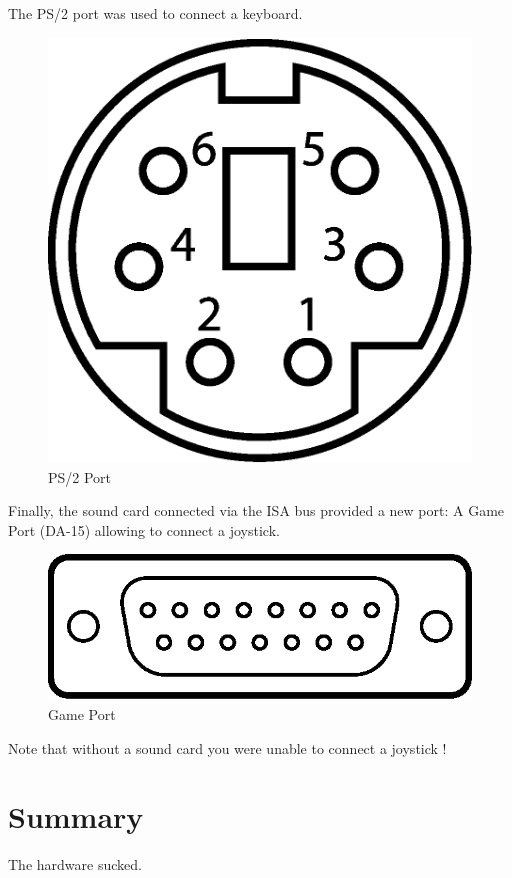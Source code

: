 \documentclass[book.tex]{subfiles}
\begin{document}
The PS/2 port was used to connect a keyboard.
 \begin{figure}[H]
\centering
\includegraphics[scale=0.2]{imgs/ports/MiniDIN-6_PS2.eps}
%
\caption{PS/2 Port}
\label{fig:ps2Port}
\end{figure}


Finally, the sound card connected via the ISA bus provided a new port: A Game Port (DA-15) allowing to connect a joystick.
 \begin{figure}[H]
\centering
\includegraphics[scale=0.9]{imgs/ports/DA-15_GamePort.eps}
%
\caption{Game Port}
\label{fig:gamePort}
\end{figure}

Note that without a sound card you were unable to connect a joystick !



\section{Summary}
The hardware sucked. 
\end{document}
